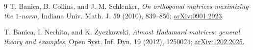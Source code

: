 \documentclass[11pt]{article}
\begin{document}
\begin{thebibliography}{9}
T. Banica, B. Collins, and J.-M. Schlenker,
\emph{On orthogonal matrices maximizing the \(1\)-norm},
Indiana Univ. Math. J. 59 (2010), 839--856;
\href{https://arxiv.org/abs/0901.2923}{arXiv:0901.2923}.

T. Banica, I. Nechita, and K. \.{Z}yczkowski,
\emph{Almost Hadamard matrices: general theory and examples},
Open Syst. Inf. Dyn. 19 (2012), 1250024;
\href{https://arxiv.org/abs/1202.2025}{arXiv:1202.2025}.
\end{thebibliography}
\end{document}
